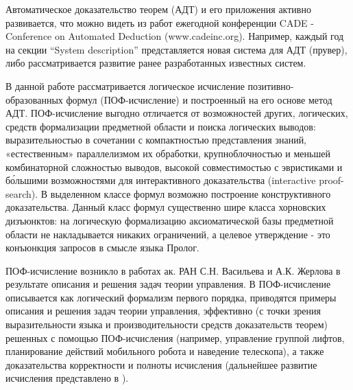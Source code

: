 \documentclass[a4paper]{jctart15b}
\begin{document}
Автоматическое доказательство теорем (АДТ) и его приложения активно развивается, что можно видеть из работ ежегодной конференции CADE - Conference on Automated Deduction (www.cadeinc.org). Например, каждый год на секции “System description” представляется новая система для АДТ (прувер), либо рассматривается развитие ранее разработанных известных систем. 

В данной работе рассматривается логическое исчисление позитивно-образованных формул (ПОФ-исчисление) и построенный на его основе метод АДТ. ПОФ-исчисление выгодно отличается от возможностей других, логических, средств формализации предметной области и поиска логических выводов: выразительностью в сочетании с компактностью представления знаний, «естественным» параллелизмом их обработки, крупноблочностью и меньшей комбинаторной сложностью выводов, высокой совместимостью с эвристиками и б\'ольшими возможностями для интерактивного доказательства (interactive proof-search). В выделенном классе формул возможно построение конструктивного доказательства. Данный класс формул существенно шире класса хорновских дизъюнктов: на логическую формализацию аксиоматической базы предметной области не накладывается никаких ограничений, а целевое утверждение - это конъюнкция запросов в смысле языка Пролог.

ПОФ-исчисление возникло в работах ак. РАН С.Н. Васильева и А.К. Жерлова \cite{SNV1990,ICDS2000} в результате описания и решения задач теории управления. В \cite{ICDS2000} ПОФ-исчисление описывается как логический формализм первого порядка, приводятся примеры описания и решения задач теории управления, эффективно (с точки зрения выразительности языка и производительности средств доказательств теорем) решенных с помощью ПОФ-исчисления (например, управление группой лифтов, планирование действий мобильного робота и наведение телескопа), а также доказательства корректности и полноты исчисления (дальнейшее развитие исчисления представлено в \cite{jour2}).
\end{document}

